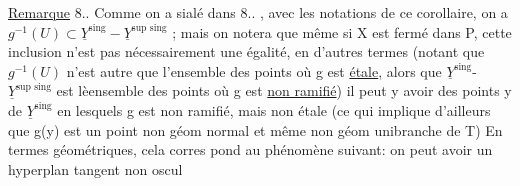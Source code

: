\uline{Remarque} 8..  Comme on a sialé dans  8.. , avec les notations de
ce corollaire, on a  $g^{-1}(U) \subset \underline{Y}^{\text{sing}} - \underline{Y}^{\text{sup sing}}$ ; mais on notera que
même si X est fermé dans P,  cette inclusion n'est pas nécessairement
 une égalité, en d'autres termes (notant que $g^{-1}(U)$ n'est autre que
l'ensemble des points où g est \uline{étale}, alors que $\underline{Y}^{\text{sing}}$-$\underline{Y}^{\text{sup sing}}$ est
lèensemble des points où g est \uline{non ramifié}) il peut y avoir des points
y de $\underline{Y}^{\text{sing}}$ en lesquels  g est  non ramifié, mais non étale (ce qui
 implique d'ailleurs que g(y) est un point non  géom normal et même
non géom unibranche de  T)  En termes géométriques, cela corres%
pond au phénomène suivant: on peut avoir un hyperplan tangent non oscul
